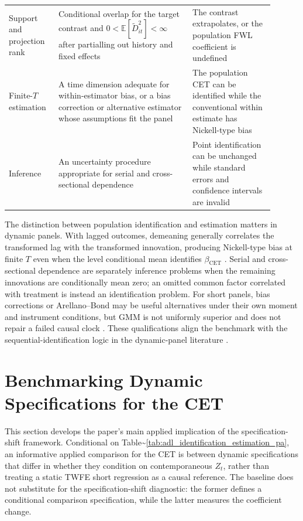 \documentclass[
]{article}
\begin{document}
\begin{table}[H]
\begin{tabular}{>{\raggedright\arraybackslash}p{0.16\linewidth} >{\raggedright\arraybackslash}p{0.46\linewidth} >{\raggedright\arraybackslash}p{0.28\linewidth}}
Support and projection rank & Conditional overlap for the target contrast and $0<\mathbb{E}[\widetilde D_{it}^{2}]<\infty$ after partialling out history and fixed effects & The contrast extrapolates, or the population FWL coefficient is undefined \\
Finite-$T$ estimation & A time dimension adequate for within-estimator bias, or a bias correction or alternative estimator whose assumptions fit the panel & The population CET can be identified while the conventional within estimate has Nickell-type bias \\
Inference & An uncertainty procedure appropriate for serial and cross-sectional dependence & Point identification can be unchanged while standard errors and confidence intervals are invalid \\
\bottomrule
\end{tabular}
\end{table}

The distinction between population identification and estimation matters
in dynamic panels. With lagged outcomes, demeaning generally correlates
the transformed lag with the transformed innovation, producing
Nickell-type bias at finite \(T\) even when the level conditional mean
identifies \(\beta_{\mathrm{CET}}\) \citep{nickell1981biases}. Serial
and cross-sectional dependence are separately inference problems when
the remaining innovations are conditionally mean zero; an omitted common
factor correlated with treatment is instead an identification problem.
For short panels, bias corrections or Arellano--Bond may be useful
alternatives under their own moment and instrument conditions, but GMM
is not uniformly superior and does not repair a failed causal clock
\citep{arellano_bond1991}. These qualifications align the benchmark with
the sequential-identification logic in the dynamic-panel literature
\citep{blackwell2018make,imai_kim2021}.

\section{\texorpdfstring{Benchmarking Dynamic Specifications for the CET
\label{sec:benchmark}}{Benchmarking Dynamic Specifications for the CET }}\label{benchmarking-dynamic-specifications-for-the-cet}

This section develops the paper's main applied implication of the
specification-shift framework. Conditional on
Table\textasciitilde{}\ref{tab:adl_identification_estimation_pa}, an
informative applied comparison for the CET is between dynamic
specifications that differ in whether they condition on contemporaneous
\(Z_t\), rather than treating a static TWFE short regression as a causal
reference. The baseline does not substitute for the specification-shift
diagnostic: the former defines a conditional comparison specification,
while the latter measures the coefficient change.
\end{document}
